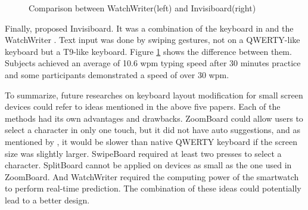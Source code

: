 \documentclass[11pt]{article}
\begin{document}
\begin{figure}[H]
\centering
{}\hfill
{}\hfill
\caption{Comparison between WatchWriter(left) and Invisiboard(right)} \label{fig:watchcomparison}
\end{figure}

Finally, \citet{10.1145/2935334.2935360} proposed Invisiboard. It was a combination of the keyboard in \citet{6926662} and the WatchWriter \citep{10.1145/2858036.2858242}. Text input was done by swiping gestures, not on a QWERTY-like keyboard but a T9-like keyboard. Figure \ref{fig:watchcomparison} shows the difference between them. Subjects achieved an average of 10.6 wpm typing speed after 30 minutes practice and some participants demonstrated a speed of over 30 wpm.

To summarize, future researches on keyboard layout modification for small screen devices could refer to ideas mentioned in the above five papers. Each of the methods had its own advantages and drawbacks. ZoomBoard could allow users to select a character in only one touch, but it did not have auto suggestions, and as mentioned by \citet{10.1145/2702123.2702273}, it would be slower than native QWERTY keyboard if the screen size was slightly larger. SwipeBoard required at least two presses to select a character. SplitBoard cannot be applied on devices as small as the one used in ZoomBoard. And WatchWriter required the computing power of the smartwatch to perform real-time prediction. The combination of these ideas could potentially lead to a better design.
\end{document}
